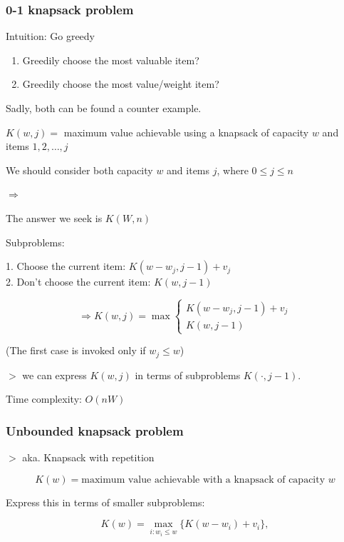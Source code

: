 \documentclass[12pt,a4paper]{article}
\newcommand{\remark}[1]{
    $>$ {\color{blue} #1}
}
\begin{document}
\subsubsection*{0-1 knapsack problem}

Intuition: Go greedy

\begin{enumerate}
  \item Greedily choose the most valuable item?
  \item Greedily choose the most value/weight item?
\end{enumerate}

Sadly, both can be found a counter example.

$K(w, j) =$ maximum value achievable using a knapsack of capacity $w$ and items $1, 2, \dots, j$

We should consider both capacity $w$ and items $j$, where $0 \leq j \leq n$

$\Rightarrow$

The answer we seek is $K(W, n)$

Subproblems:

1. Choose the current item: $K(w - w_j, j - 1) + v_j$ \\
2. Don't choose the current item: $K(w, j - 1)$

\[
\Rightarrow
K(w, j) = \max \left\{
\begin{array}{l}
    K(w - w_j, j - 1) + v_j \\
    K(w, j - 1)
\end{array}
\right.
\]

\begin{center}
(The first case is invoked only if $w_j \leq w$)
\end{center}

\remark{we can express $K(w, j)$ in terms of subproblems $K(\cdot, j - 1)$.}

Time complexity: $O(nW)$

\subsubsection*{Unbounded knapsack problem}

\remark{aka. Knapsack with repetition}

\[K(w) = \text{maximum value achievable with a knapsack of capacity } w\]

Express this in terms of smaller subproblems:

\[
K(w) = \max_{i : w_i \leq w} \{ K(w - w_i) + v_i \},
\]
\end{document}
